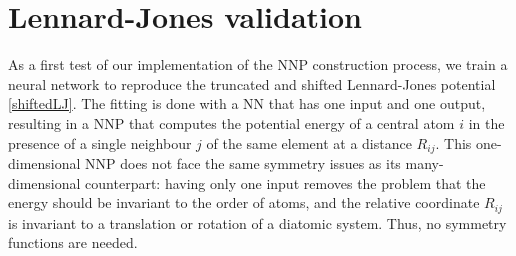 \documentclass[twoside,english]{uiofysmaster}
\begin{document}
\chapter{Lennard-Jones validation} \label{sec:LJValidation}
As a first test of our implementation of the NNP construction process, we train a neural network to reproduce 
the truncated and shifted Lennard-Jones potential \eqref{shiftedLJ}. 
The fitting is done with a NN that has one input and one output, resulting in 
a NNP that computes the potential energy of a central atom $i$ in the presence of a single neighbour $j$ of the same element at 
a distance $R_{ij}$. This one-dimensional NNP does not face the same symmetry issues as its many-dimensional counterpart: 
having only one input removes the problem that the energy should be invariant to the order of atoms, and 
the relative coordinate $R_{ij}$ is invariant to a translation or rotation of a diatomic system. Thus, no symmetry functions 
are needed. 
\end{document}
